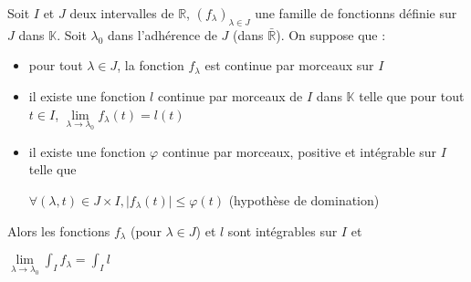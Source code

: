 \documentclass[a4paper,12pt]{book}
\newcommand{\Thr}[2]{\begin{tcolorbox}[sharp corners, colback=white,colframe=red!90!black!75, title=Théorème : #1]#2\end{tcolorbox}}
\def\R{\mathbb{R}}
\def\K{\mathbb{K}}
\begin{document}
\Thr{Autre formulation}{Soit $I$ et $J$ deux intervalles de $\R$, $(f_\lambda)_{\lambda\in J}$ une famille de fonctionns définie sur $J$ dans $\K$. Soit $\lambda_0$ dans l'adhérence de $J$ (dans $\bar{\R}$). On suppose que :\begin{itemize}
\item pour tout $\lambda\in J$, la fonction $f_\lambda$ est continue par morceaux sur $I$
\item il existe une fonction $l$ continue par morceaux de $I$ dans $\K$ telle que pour tout $t\in I$, $\lim\limits_{\lambda\to\lambda_0}f_\lambda(t)=l(t)$
\item il existe une fonction $\varphi$ continue par morceaux, positive et intégrable sur $I$ telle que \par \begin{center}$\forall (\lambda, t)\in J\times I, \vert f_\lambda(t)\vert\leq \varphi(t)$ (hypothèse de domination)\end{center}
\end{itemize}
Alors les fonctions $f_\lambda$ (pour $\lambda\in J$) et $l$ sont intégrables sur $I$ et \par \begin{center} $\lim\limits_{\lambda\to\lambda_0}\int_If_\lambda=\int_Il$\end{center}}
\end{document}
